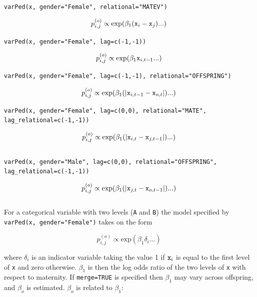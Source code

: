 \documentclass{article}
\begin{document}
\texttt{varPed(x, gender="Female", relational="MATEV")}

\begin{equation}
p^{(o)}_{i,j} \propto \textrm{exp}(\beta_{1}(\textrm{\texttt{x}}_{i}-\textrm{\texttt{x}}_{j})...)
\end{equation}

\texttt{varPed(x, gender="Female", lag=c(-1,-1))}

\begin{equation}
p^{(o)}_{i,j} \propto \textrm{exp}(\beta_{1}\textrm{\texttt{x}}_{i,t-1}...)
\end{equation}

\texttt{varPed(x, gender="Female", lag=c(-1,-1), relational="OFFSPRING")}

\begin{equation}
p^{(o)}_{i,j} \propto \textrm{exp}(\beta_{1}(|\textrm{\texttt{x}}_{i,t-1}-\textrm{\texttt{x}}_{o,t}|)...)
\end{equation}

\texttt{varPed(x, gender="Female", lag=c(0,0), relational="MATE",}\\
\texttt{lag\_relational=c(-1,-1))}

\begin{equation}
p^{(o)}_{i,j} \propto \textrm{exp}(\beta_{1}(|\textrm{\texttt{x}}_{i,t}-\textrm{\texttt{x}}_{j,t-1}|)...)
\end{equation}\\

\texttt{varPed(x, gender="Male", lag=c(0,0), relational="OFFSPRING",}\\
\texttt{lag\_relational=c(-1,-1))}

\begin{equation}
p^{(o)}_{i,j} \propto \textrm{exp}(\beta_{1}(|\textrm{\texttt{x}}_{j,t}-\textrm{\texttt{x}}_{o,t-1}|)...)
\end{equation}\\

For a categorical variable with two levels (\texttt{A} and \texttt{B}) the model specified by \texttt{varPed(x, gender="Female")} takes on the form

\begin{equation}
p^{(o)}_{i,j} \propto \textrm{exp}(\beta_{1}\delta_{i}...)
\end{equation}

where $\delta_{i}$ is an indicator variable taking the value 1 if $\textrm{\texttt{x}}_{i}$ is equal to the first level of \texttt{x} and zero otherwise. $\beta_{1}$ is then the log odds ratio of the two levels of \texttt{x} with respect to maternity.  If \texttt{merge=TRUE} is specified then $\beta_{1}$ may vary across offspring, and $\beta_{o}$ is estimated. $\beta_{o}$ is related to $\beta_{1}$:
\end{document}
